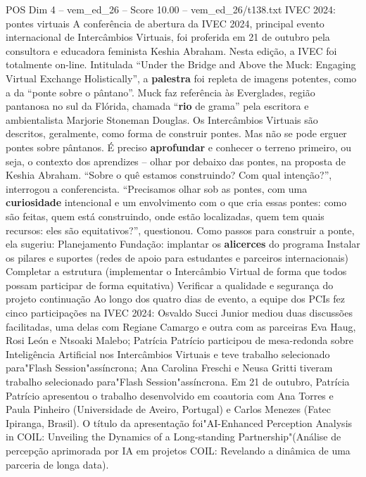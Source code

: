 \begin{textsample}{POS Dim 4 – vem\_ed\_26 – Score 10.00 – vem\_ed\_26/t138.txt}  \label{ex:f4_pos_011}
IVEC 2024: pontes virtuais A conferência de abertura da IVEC 2024, principal evento internacional de Intercâmbios Virtuais, foi proferida em 21 de outubro pela consultora e educadora feminista Keshia Abraham.
Nesta edição, a IVEC foi totalmente on-line.
Intitulada “Under the Bridge and Above the Muck: Engaging Virtual Exchange Holistically”, a \textbf{palestra} foi repleta de imagens potentes, como a da “ponte sobre o pântano”.
Muck faz referência às Everglades, região pantanosa no sul da Flórida, chamada “\textbf{rio} de grama” pela escritora e ambientalista Marjorie Stoneman Douglas.
Os Intercâmbios Virtuais são descritos, geralmente, como forma de construir pontes.
Mas não se pode erguer pontes sobre pântanos.
É preciso \textbf{aprofundar} e conhecer o terreno primeiro, ou seja, o contexto dos aprendizes – olhar por debaixo das pontes, na proposta de Keshia Abraham. “Sobre o quê estamos construindo?
Com qual intenção?”, interrogou a conferencista. “Precisamos olhar sob as pontes, com uma \textbf{curiosidade} intencional e um envolvimento com o que cria essas pontes: como são feitas, quem está construindo, onde estão localizadas, quem tem quais recursos: eles são equitativos?”, questionou.
Como passos para construir a ponte, ela sugeriu: Planejamento Fundação: implantar os \textbf{alicerces} do programa Instalar os pilares e suportes (redes de apoio para estudantes e parceiros internacionais) Completar a estrutura (implementar o Intercâmbio Virtual de forma que todos possam participar de forma equitativa) Verificar a qualidade e segurança do projeto continuação Ao longo dos quatro dias de evento, a equipe dos PCIs fez cinco participações na IVEC 2024: Osvaldo Succi Junior mediou duas discussões facilitadas, uma delas com Regiane Camargo e outra com as parceiras Eva Haug, Rosi León e Ntsoaki Malebo; Patrícia Patrício participou de mesa-redonda sobre Inteligência Artificial nos Intercâmbios Virtuais e teve trabalho selecionado para"Flash Session"assíncrona; Ana Carolina Freschi e Neusa Gritti tiveram trabalho selecionado para"Flash Session"assíncrona.
Em 21 de outubro, Patrícia Patrício apresentou o trabalho desenvolvido em coautoria com Ana Torres e Paula Pinheiro (Universidade de Aveiro, Portugal) e Carlos Menezes (Fatec Ipiranga, Brasil).
O título da apresentação foi"AI-Enhanced Perception Analysis in COIL: Unveiling the Dynamics of a Long-standing Partnership"(Análise de percepção aprimorada por IA em projetos COIL: Revelando a dinâmica de uma parceria de longa data).

\end{textsample}
